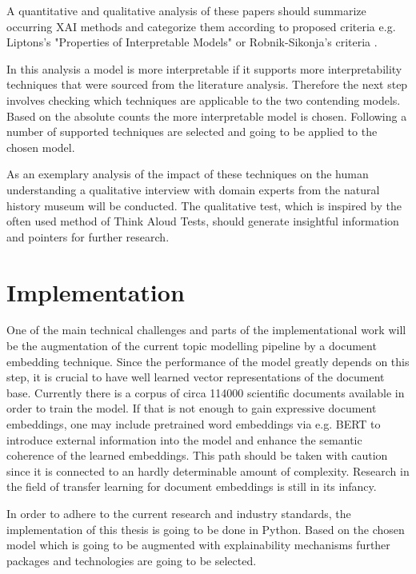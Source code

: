 \documentclass[pdftex,a4paper,12pt]{scrartcl}
\begin{document}
A quantitative and qualitative analysis of these papers should summarize occurring XAI methods and categorize them according to proposed criteria e.g. Liptons's "Properties of Interpretable Models" \cite{liptonMythosModelInterpretability2016} or Robnik-Sikonja's criteria \cite{robnik-sikonjaPerturbationBasedExplanationsPrediction2018}.

In this analysis a model is more interpretable if it supports more interpretability techniques that were sourced from the literature analysis. Therefore the next step involves checking which techniques are applicable to the two contending models. Based on the absolute counts the more interpretable model is chosen. Following a number of supported techniques are selected and going to be applied to the chosen model.

As an exemplary analysis of the impact of these techniques on the human understanding a qualitative interview with domain experts from the natural history museum will be conducted. The qualitative test, which is inspired by the often used method of Think Aloud Tests, should generate insightful information and pointers for further research.



\section{Implementation}

One of the main technical challenges and parts of the implementational work will be the augmentation of the current topic modelling pipeline by a document embedding technique. Since the performance of the model greatly depends on this step, it is crucial to have well learned vector representations of the document base. Currently there is a corpus of circa 114000 scientific documents available in order to train the model. If that is not enough to gain expressive document embeddings, one may include pretrained word embeddings via e.g. BERT \cite{devlinBERTPretrainingDeep2018} to introduce external information into the model and enhance the semantic coherence of the learned embeddings. This path should be taken with caution since it is connected to an hardly determinable amount of complexity. Research in the field of transfer learning for document embeddings is still in its infancy.

In order to adhere to the current research and industry standards, the implementation of this thesis is going to be done in Python. Based on the chosen model which is going to be augmented with explainability mechanisms further packages and technologies are going to be selected.
\end{document}

